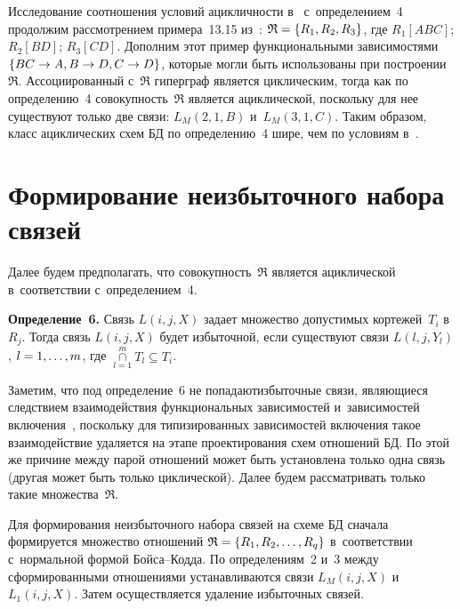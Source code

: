 \begin{multicols}{2}
\vspace*{2pt}

  Исследование соотношения условий ацикличности в~\cite{9-z}
с~определением~4 продолжим рас\-смот\-ре\-нием примера~13.15 из~\cite{3-z}:
$\mathfrak{R}\hm= \{R_1, R_2, R_3\}$, где $R_1[ABC]$; $R_2[BD]$;
$R_3[CD]$. Дополним этот пример функциональными зависимостями
$\{BC\hm\to A, B\hm\to D, C\hm\to D\}$, которые могли быть использованы при
построении~$\mathfrak{R}$. Ассоциированный с~$\mathfrak{R}$ гиперграф
является циклическим, тогда как по определению~4
совокупность~$\mathfrak{R}$ является ациклической, поскольку для нее
существуют только две связи: $L_M(2,1,B)$ и~$L_M(3,1,C)$. Таким образом,
класс ациклических схем БД по определению~4 шире, чем по условиям
в~\cite{9-z}.

\section{Формирование неизбыточного набора связей}

  Далее будем предполагать, что совокупность~$\mathfrak{R}$ является
ациклической в~соответствии с~определением~4.

  \smallskip

  \noindent
  \textbf{Определение~6.}
  Связь $L(i,j,X)$ задает множество допустимых кортежей~$T_i$ в~$R_j$.
Тогда связь $L(i,j,X)$ будет избыточной, если существуют связи $L(l,j,Y_l)$,
$l\hm= 1,\ldots ,m$, где $\mathop{\cap}\limits_{l=1}^m T_l\subseteq T_i$.

  \smallskip

  Заметим, что под определение~6 не попадают\linebreak избыточ\-ные связи,
являющиеся следствием взаимо\-действия функциональных зависимостей и~зависимостей включения~\cite{5-z, 7-z}, поскольку для типизированных
зависимостей включения такое взаимодействие удаляется на этапе
проектирования схем отношений БД. По этой же причине между парой
отношений может быть установлена только одна связь (другая может быть
только циклической). Далее будем рассматривать только такие
множества~$\mathfrak{R}$.

  Для формирования неизбыточного набора связей на схеме БД сначала
формируется множество отношений $\mathfrak{R}\hm= \{R_1, R_2, \ldots ,
R_q\}$ в~соответствии с~нормальной формой Бой\-са--Код\-да. По
определениям~2 и~3 между сформированными отношениями устанавливаются
связи $L_M(i,j,X)$ и~$L_1(i,j,X)$. Затем осуществляется удаление избыточных
связей.


\end{multicols}
